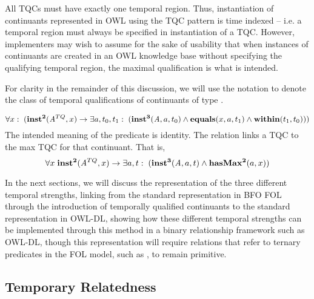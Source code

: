 All TQCs must have exactly one temporal region. Thus, instantiation of continuants represented in OWL using the TQC pattern is time indexed -- i.e. a temporal region must always be specified in instantiation of a TQC. However, implementers may wish to assume for the sake of usability that when instances of continuants are created in an OWL knowledge base without specifying the qualifying temporal region, the maximal qualification is what is intended. 

For clarity in the remainder of this discussion, we will use the notation  to denote the class of temporal qualifications of
continuants of type .

\begin{equation}
\forall x:\; (\mathrm{\mathbf{inst^2}}(\mathit{A}^{TQ},x) \rightarrow \exists a,t_0,t_1:\;(
\mathrm{\mathbf{inst^3}}(\mathit{A},a,t_0) \wedge \mathrm{\mathbf{equals}}(x,a,t_1) \wedge
\mathrm{\mathbf{within}}(t_1,t_0)))
\end{equation}
The intended meaning of the predicate  is identity.  
The relation  links a TQC to the max TQC for that continuant. That is,
\begin{equation}
\forall x\; \mathrm{\mathbf{inst^2}}(\mathit{A}^{TQ},x) \rightarrow \exists a,t:\;(
\mathrm{\mathbf{inst^3}}(\mathit{A}, a,t) \wedge \mathrm{\mathbf{hasMax^2}}(a,x))
\end{equation}

In the next sections, we will discuss the representation of the three different
temporal strengths, linking from the standard representation in BFO FOL through
the introduction of temporally qualified continuants to the standard
representation in OWL-DL, showing how these different temporal strengths can be
implemented through this method in a binary relationship framework such as OWL-DL,
though this representation will require relations that refer to ternary
predicates in the FOL model, such as , to remain primitive.

\subsection*{Temporary Relatedness}

